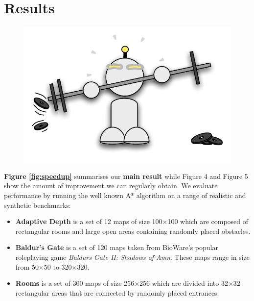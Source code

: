 \section{Results}
 \begin{figure}
		\includegraphics[width=0.4\columnwidth]{diagrams/robot_weights.pdf}
 \end{figure}

\textbf{Figure \ref{fig:speedup}} summarises our \textbf{main result} while Figure
4 and Figure 5 show the amount of improvement we
can regularly obtain. We evaluate performance by running the well known A* algorithm on a range of realistic and synthetic benchmarks:
\begin{itemize}
\item{
\textbf{Adaptive Depth} is a set of 12 maps of size 100$\times$100 which are
composed of rectangular rooms and large open areas containing randomly placed obstacles.
}
\item{
\textbf{Baldur's Gate} is a set of 120 maps taken from BioWare's popular
roleplaying game \emph{Baldurs Gate II: Shadows of Amn}. 
These maps range in size from 50$\times$50 to 320$\times$320.
}
\item{
\textbf{Rooms} is a set of 300 maps of size 256$\times$256 which are divided into 32$\times$32
rectangular areas that are connected by randomly placed entrances.
}
\end{itemize}


